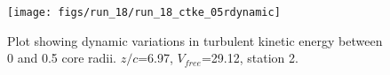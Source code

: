 \begin{figure}[H]
\centering
\texttt{[image: figs/run\_18/run\_18\_ctke\_05rdynamic]}
\caption{Plot showing dynamic variations in turbulent kinetic energy between 0 and 0.5 core radii. $z/c$=6.97, $V_{free}$=29.12, station 2.}
\label{fig:run_18_ctke_05rdynamic}
\end{figure}


